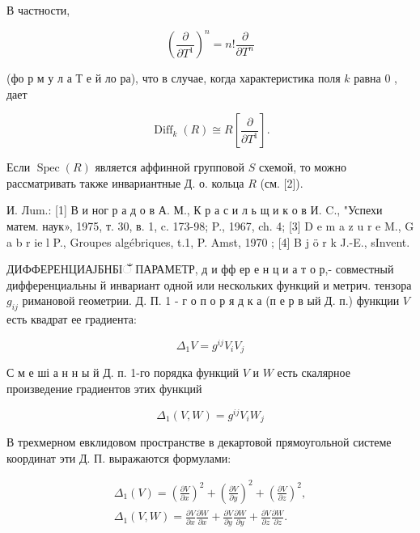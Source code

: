 \documentclass[10pt]{article}
\begin{document}
В частности,



\[

\left(\frac{\partial}{\partial T^{1}}\right)^{n}=n ! \frac{\partial}{\partial T^{n}}

\]



(фо р м у л а Т е й ло ра), что в случае, когда характеристика поля $k$ равна 0 , дает



\[

\operatorname{Diff}_{k}(R) \cong R\left[\frac{\partial}{\partial T^{1}}\right] .

\]



Если $\operatorname{Spec}(R)$ является аффинной групповой $S$ схемой, то можно рассматривать также инвариантные Д. о. кольца $R$ (см. [2]).



И. Лum.: [1] В и ног р а д о в А. М., К р а с и л ь щ и к о в И. C., "Успехи матем. наук», 1975, т. 30, в. 1, c. 173-98; P., 1967, ch. 4; [3] D e m a z u r e M., G a b r ie l P., Groupes algébriques, t.1, P. Amst, 1970 ; [4] B j ö r k J.-E., sInvent.



ДИФФЕРЕНЦИАЈБНБІઁ ПАРАМЕТР, д и фф ер е н ц и а т о р,- совместный дифференциальны й инвариант одной или нескольких функций и метрич. тензора $g_{i j}$ римановой геометрии. Д. П. 1 - г о п о р я д к а (п е р в ый Д. п.) функции $V$ есть квадрат ее градиента:



\[

\Delta_{1} V=g^{i j} V_{i} V_{j}

\]



С м е ші а н н ы й Д. п. 1-го порядка функций $V$ и $W$ есть скалярное произведение градиентов этих функций



\[

\Delta_{1}(V, W)=g^{i j} V_{i} W_{j}

\]



В трехмерном евклидовом пространстве в декартовой прямоугольной системе координат эти Д. П. выражаются формулами:



\[

\begin{gathered}

\Delta_{1}(V)=\left(\frac{\partial V}{\partial x}\right)^{2}+\left(\frac{\partial V}{\partial y}\right)^{2}+\left(\frac{\partial V}{\partial z}\right)^{2}, \\

\Delta_{1}(V, W)=\frac{\partial V}{\partial x} \frac{\partial W}{\partial x}+\frac{\partial V}{\partial y} \frac{\partial W}{\partial y}+\frac{\partial V}{\partial z} \frac{\partial W}{\partial z} .

\end{gathered}

\]
\end{document}
